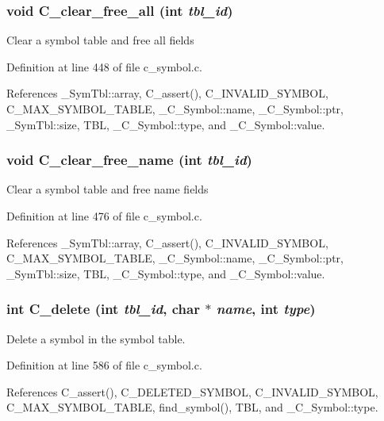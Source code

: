 \subsubsection{\setlength{\rightskip}{0pt plus 5cm}void C\_\-clear\_\-free\_\-all (int {\em tbl\_\-id})}\label{c__symbol_8h_dc760e695d2d45490fa60d1984cb2d59}


Clear a symbol table and free all fields 

Definition at line 448 of file c\_\-symbol.c.

References \_\-Sym\-Tbl::array, C\_\-assert(), C\_\-INVALID\_\-SYMBOL, C\_\-MAX\_\-SYMBOL\_\-TABLE, \_\-C\_\-Symbol::name, \_\-C\_\-Symbol::ptr, \_\-Sym\-Tbl::size, TBL, \_\-C\_\-Symbol::type, and \_\-C\_\-Symbol::value.
\subsubsection{\setlength{\rightskip}{0pt plus 5cm}void C\_\-clear\_\-free\_\-name (int {\em tbl\_\-id})}\label{c__symbol_8h_b358a580d5e4af034117efd93533d1cf}


Clear a symbol table and free name fields 

Definition at line 476 of file c\_\-symbol.c.

References \_\-Sym\-Tbl::array, C\_\-assert(), C\_\-INVALID\_\-SYMBOL, C\_\-MAX\_\-SYMBOL\_\-TABLE, \_\-C\_\-Symbol::name, \_\-C\_\-Symbol::ptr, \_\-Sym\-Tbl::size, TBL, \_\-C\_\-Symbol::type, and \_\-C\_\-Symbol::value.
\subsubsection{\setlength{\rightskip}{0pt plus 5cm}int C\_\-delete (int {\em tbl\_\-id}, char $\ast$ {\em name}, int {\em type})}\label{c__symbol_8h_65764557639df2713c9f127da4ffa222}


Delete a symbol in the symbol table. 

Definition at line 586 of file c\_\-symbol.c.

References C\_\-assert(), C\_\-DELETED\_\-SYMBOL, C\_\-INVALID\_\-SYMBOL, C\_\-MAX\_\-SYMBOL\_\-TABLE, find\_\-symbol(), TBL, and \_\-C\_\-Symbol::type.
